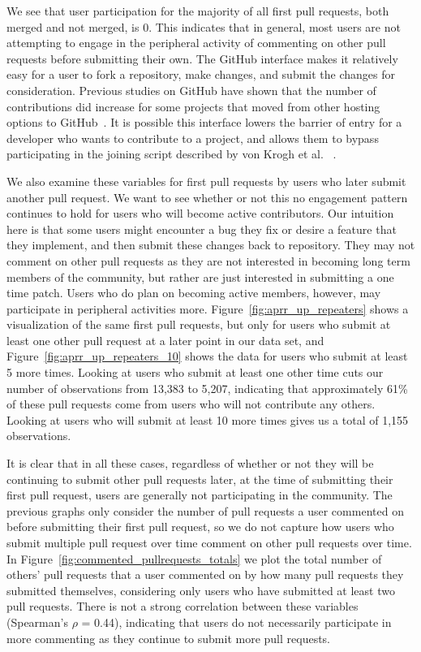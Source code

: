 \documentclass{iitthesis}
\begin{document}
 \label{chap:results}


We see that user participation for the majority of all first pull requests, both
merged and not merged, is 0. This indicates that in general, most users are not
attempting to engage in the peripheral activity of commenting on other pull
requests before submitting their own. The GitHub interface makes it relatively
easy for a user to fork a repository, make changes, and submit the changes for
consideration. Previous studies on GitHub have shown that the number of
contributions did increase for some projects that moved from other hosting
options to GitHub~\cite{mcdonald_performance_2013}. It is possible this
interface lowers the barrier of entry for a developer who wants to contribute to
a project, and allows them to bypass participating in the joining script
described by von Krogh et al. ~\cite{von_krogh_community_2003}.

We also examine these variables for first pull requests by users who later
submit another pull request. We want to see whether or not this no engagement
pattern continues to hold for users who will become active contributors. Our
intuition here is that some users might encounter a bug they fix or desire a
feature that they implement, and then submit these changes back to repository.
They may not comment on other pull requests as they are not interested in
becoming long term members of the community, but rather are just interested in
submitting a one time patch. Users who do plan on becoming active members,
however, may participate in peripheral activities more.
Figure~\ref{fig:aprr_up_repeaters} shows a visualization of the same first pull
requests, but only for users who submit at least one other pull request at a
later point in our data set, and Figure~\ref{fig:aprr_up_repeaters_10} shows the
data for users who submit at least 5 more times. Looking at users who submit at
least one other time cuts our number of observations from 13,383 to 5,207,
indicating that approximately 61\% of these pull requests come from users who
will not contribute any others. Looking at users who will submit at least 10
more times gives us a total of 1,155 observations.

It is clear that in all these cases, regardless of whether or not they will be
continuing to submit other pull requests later, at the time of submitting their
first pull request, users are generally not participating in the community. The
previous graphs only consider the number of pull requests a user commented on
before submitting their first pull request, so we do not capture how users who
submit multiple pull request over time comment on other pull requests over time.
In Figure~\ref{fig:commented_pullrequests_totals} we plot the total number of
others' pull requests that a user commented on by how many pull requests they
submitted themselves, considering only users who have submitted at least two
pull requests. There is not a strong correlation between these variables
(Spearman's $\rho$  = 0.44), indicating that users do not necessarily
participate in more commenting as they continue to submit more pull requests.
\end{document}
